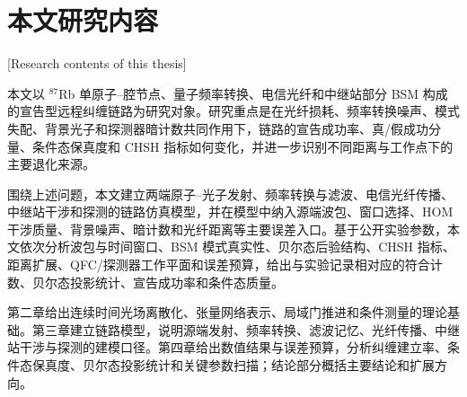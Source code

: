 \FloatBarrier


\section{本文研究内容}[Research contents of this thesis]

本文以 $^{87}$Rb 单原子--腔节点、量子频率转换、电信光纤和中继站部分 BSM 构成的宣告型远程纠缠链路为研究对象\cite{vanleent2020longdistance,vanleent2022entangling,Ikuta2018PolarizationInsensitiveQFC}。研究重点是在光纤损耗、频率转换噪声、模式失配、背景光子和探测器暗计数共同作用下，链路的宣告成功率、真/假成功分量、条件态保真度和 CHSH 指标如何变化，并进一步识别不同距离与工作点下的主要退化来源。

围绕上述问题，本文建立两端原子--光子发射、频率转换与滤波、电信光纤传播、中继站干涉和探测的链路仿真模型，并在模型中纳入源端波包、窗口选择、HOM 干涉质量、背景噪声、暗计数和光纤距离等主要误差入口。基于公开实验参数，本文依次分析波包与时间窗口、BSM 模式真实性、贝尔态后验结构、CHSH 指标、距离扩展、QFC/探测器工作平面和误差预算，给出与实验记录相对应的符合计数、贝尔态投影统计、宣告成功率和条件态质量。

第二章给出连续时间光场离散化、张量网络表示、局域门推进和条件测量的理论基础。第三章建立链路模型，说明源端发射、频率转换、滤波记忆、光纤传播、中继站干涉与探测的建模口径。第四章给出数值结果与误差预算，分析纠缠建立率、条件态保真度、贝尔态投影统计和关键参数扫描；结论部分概括主要结论和扩展方向。
